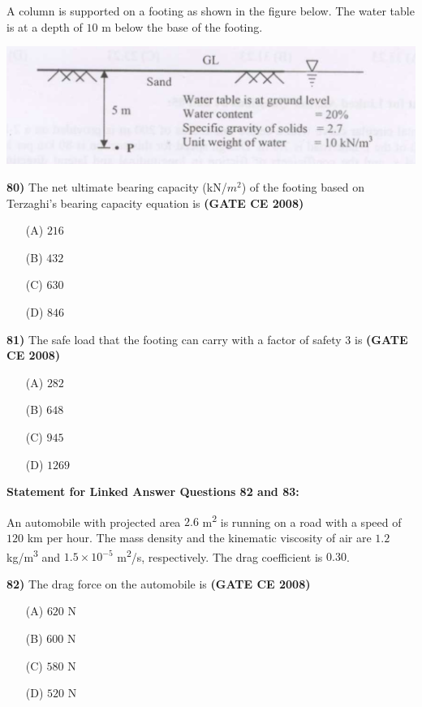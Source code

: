 \documentclass[journal]{IEEEtran}
\begin{document}
\begin{enumerate}
A column is supported on a footing as shown in the figure below. The water table is at a depth of $10$ m below the base of the footing.

\vspace{0.3cm}
\includegraphics[width=\textwidth]{image10.png} 
\vspace{0.3cm}

\textbf{80)} The net ultimate bearing capacity (kN/$m^{2}$) of the footing based on Terzaghi's bearing capacity equation is \textbf{(GATE CE 2008)}
\begin{itemize}
    \item[(A)] $216$
    \item[(B)] $432$
    \item[(C)] $630$
    \item[(D)] $846$
\end{itemize}

\textbf{81)} The safe load  that the footing can carry with a factor of safety $3$ is \textbf{(GATE CE 2008)}
\begin{itemize}
    \item[(A)] $282$
    \item[(B)] $648$
    \item[(C)] $945$
    \item[(D)] $1269$
\end{itemize}

\vspace{0.5cm}
\textbf{Statement for Linked Answer Questions 82 and 83:}

An automobile with projected area $2.6$ m\textsuperscript{2} is running on a road with a speed of $120$ km per hour. The mass density and the kinematic viscosity of air are $1.2$ kg/m\textsuperscript{3} and $1.5 \times 10^{-5}$ m\textsuperscript{2}/s, respectively. The drag coefficient is $0.30$.

\textbf{82)} The drag force on the automobile is \textbf{(GATE CE 2008)}
\begin{itemize}
    \item[(A)] $620$ N
    \item[(B)] $600$ N
    \item[(C)] $580$ N
    \item[(D)] $520$ N
\end{itemize}


\end{enumerate}
\end{document}
